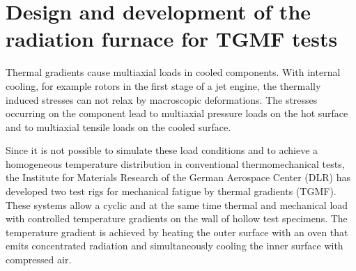 %

\section{Design and development of the radiation furnace for TGMF tests}
\noindent
Thermal gradients cause multiaxial loads in cooled components. With internal cooling, for example rotors in the first stage of a jet engine, the thermally induced stresses can not relax by macroscopic deformations. The stresses occurring on the component lead to multiaxial pressure loads on the hot surface and to multiaxial tensile loads on the cooled surface.

Since it is not possible to simulate these load conditions and to achieve a homogeneous temperature distribution in conventional thermomechanical tests, the Institute for Materials Research of the German Aerospace Center (DLR) has developed two test rigs for mechanical fatigue by thermal gradients (TGMF). These systems allow a cyclic and at the same time thermal and mechanical load with controlled temperature gradients on the wall of hollow test specimens. The temperature gradient is achieved by heating the outer surface with an oven that emits concentrated radiation and simultaneously cooling the inner surface with compressed air.

